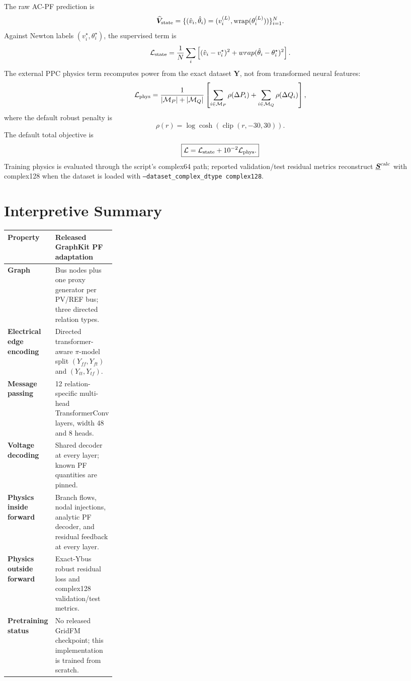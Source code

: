 \documentclass[10pt]{article}
\newcommand{\wrap}{\operatorname{wrap}}
\newcommand{\maskP}{\mathcal M_P}
\newcommand{\maskQ}{\mathcal M_Q}
\newcommand{\code}[1]{\texttt{#1}}
\begin{document}
The raw AC-PF prediction is
\begin{equation}
 \widehat{\bm V}_{\rm state}=
 \{(\hat v_i,\hat\theta_i)=(v_i^{(L)},\wrap(\theta_i^{(L)}))\}_{i=1}^{N}.
\end{equation}
Against Newton labels \((v_i^\star,\theta_i^\star)\), the supervised term is
\begin{equation}
 \mathcal L_{\rm state}=\frac1N\sum_i
 \left[(\hat v_i-v_i^\star)^2+wrap(\hat\theta_i-\theta_i^\star)^2\right].
\end{equation}
The external PPC physics term recomputes power from the exact dataset \(\bm Y\),
not from transformed neural features:
\begin{equation}
 \mathcal L_{\rm phys}=\frac1{|\maskP|+|\maskQ|}
 \left[\sum_{i\in\maskP}\rho(\Delta P_i)+
 \sum_{i\in\maskQ}\rho(\Delta Q_i)\right],
\end{equation}
where the default robust penalty is
\begin{equation}
 \rho(r)=\log\cosh(\operatorname{clip}(r,-30,30)).
\end{equation}
The default total objective is
\begin{equation}
 \boxed{\mathcal L=\mathcal L_{\rm state}+10^{-2}\mathcal L_{\rm phys}.}
\end{equation}
Training physics is evaluated through the script's complex64 path; reported
validation/test residual metrics reconstruct \(\underline{\bm S}^{\rm calc}\)
with complex128 when the dataset is loaded with
\code{--dataset\_complex\_dtype complex128}.

\section{Interpretive Summary}

\begin{tabularx}{\linewidth}{>{\bfseries}p{0.25\linewidth}X}
\toprule
Property & Released GraphKit PF adaptation \\
\midrule
Graph & Bus nodes plus one proxy generator per PV/REF bus; three directed relation types.\\
Electrical edge encoding & Directed transformer-aware \(\pi\)-model split \((Y_{ff},Y_{ft})\) and \((Y_{tt},Y_{tf})\).\\
Message passing & 12 relation-specific multi-head TransformerConv layers, width 48 and 8 heads.\\
Voltage decoding & Shared decoder at every layer; known PF quantities are pinned.\\
Physics inside forward & Branch flows, nodal injections, analytic PF decoder, and residual feedback at every layer.\\
Physics outside forward & Exact-Ybus robust residual loss and complex128 validation/test metrics.\\
Pretraining status & No released GridFM checkpoint; this implementation is trained from scratch.\\
\bottomrule
\end{tabularx}
\end{document}

